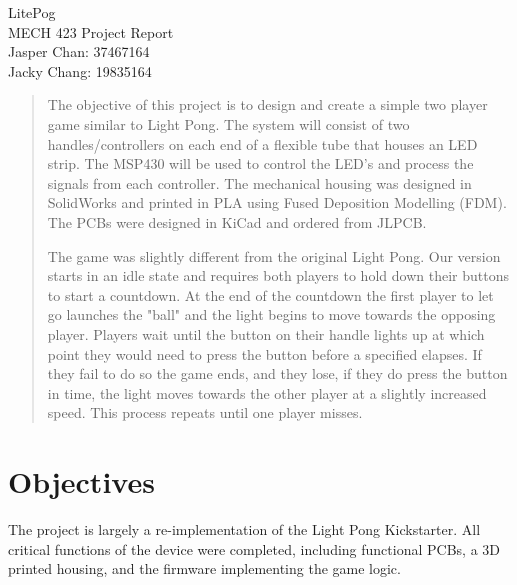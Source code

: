 \documentclass{notes}
\begin{document}
\vspace*{\fill}
\begin{center}
    {\centering\huge{LitePog}}\\
    \vspace*{2em}
    {\centering\huge{MECH 423 Project Report}}\\
    \vspace*{2em}
    {\large Jasper Chan: 37467164 }\\
    {\large Jacky Chang: 19835164 }
\end{center}
\vspace*{\fill}
\newpage

\begin{abstract}
    The objective of this project is to design and create a simple two player game similar to Light Pong\footnotemark.
    The system will consist of two handles/controllers on each end of a flexible tube that houses an LED strip.
    The MSP430 will be used to control the LED's and process the signals from each controller.
    The mechanical housing was designed in SolidWorks and printed in PLA using Fused Deposition Modelling (FDM).
    The PCBs were designed in KiCad and ordered from JLPCB.

    The game was slightly different from the original Light Pong.
    Our version starts in an idle state and requires both players to hold down their buttons to start a countdown.
    At the end of the countdown the first player to let go launches the "ball" and the light begins to move towards the opposing player.
    Players wait until the button on their handle lights up at which point they would need to press the button before a specified elapses.
    If they fail to do so the game ends, and they lose, if they do press the button in time, the light moves towards the other player at a slightly increased speed.
    This process repeats until one player misses.
\end{abstract}

\section{Objectives}

The project is largely a re-implementation of the Light Pong Kickstarter.
All critical functions of the device were completed, including functional PCBs, a 3D printed housing, and the firmware implementing the game logic.
\end{document}
